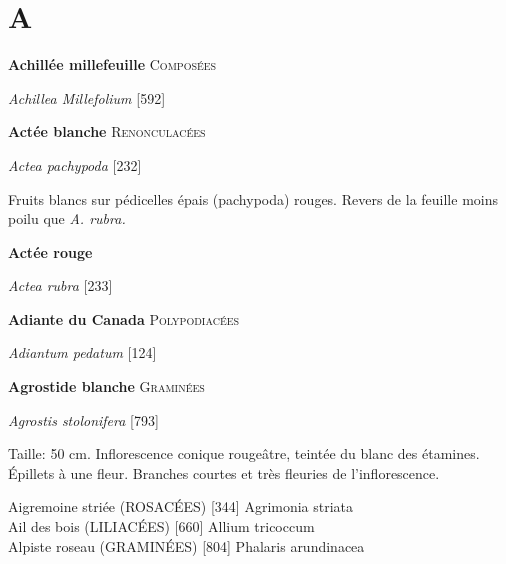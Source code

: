 



\begin{titlingpage}
\maketitle
\end{titlingpage}

\chapter*{A}

\textbf{Achillée millefeuille} \hfill {\scshape Composées}
\par\noindent\emph{Achillea Millefolium} \hfill [592]

\vskip1cm

\noindent\textbf{Actée blanche} \hfill {\scshape Renonculacées} 
\par\noindent\emph{Actea pachypoda} \hfill [232]			

Fruits blancs sur pédicelles épais (pachypoda) rouges.
Revers de la feuille moins poilu que \emph{A. rubra.}

\vskip1cm

\noindent\textbf{Actée rouge}  
\par\noindent\emph{Actea rubra} \hfill [233]

\vskip1cm

\noindent\textbf{Adiante du Canada} \hfill {\scshape Polypodiacées}
\par\noindent\emph{Adiantum pedatum} \hfill [124]

\vskip1cm
				
\noindent\textbf{Agrostide blanche} \hfill {\small\scshape Graminées}  
\par\noindent\emph{Agrostis stolonifera} \hfill [793]

Taille: 50 cm. Inflorescence conique rougeâtre,
teintée du blanc des étamines. Épillets à une fleur.
Branches courtes et très fleuries de l’inflorescence.


\newpage

Aigremoine striée (ROSACÉES)  [344]
				Agrimonia striata\\

Ail des bois (LILIACÉES)  [660]					
				Allium tricoccum\\

Alpiste roseau (GRAMINÉES)  [804]
				Phalaris arundinacea\\


